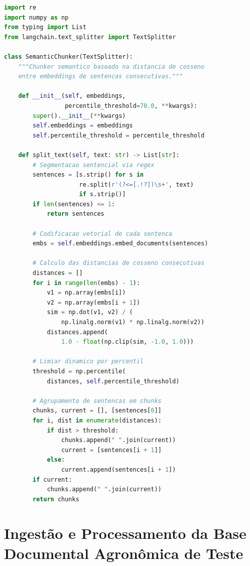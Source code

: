 \documentclass[
	12pt,				%
	openright,			%
	oneside,			%
	a4paper,			%
	tccpreliminar,		%
	]{ABNT-DC-UEL}
\begin{document}
\begin{lstlisting}[language=Python, caption={Implementação do \textit{Semantic Chunker} com \textit{breakpoints} baseados em distância de cosseno e limiar por percentil.}, label=lst:semantic]
import re
import numpy as np
from typing import List
from langchain.text_splitter import TextSplitter

class SemanticChunker(TextSplitter):
    """Chunker semantico baseado na distancia de cosseno 
    entre embeddings de sentencas consecutivas."""
    
    def __init__(self, embeddings, 
                 percentile_threshold=70.0, **kwargs):
        super().__init__(**kwargs)
        self.embeddings = embeddings
        self.percentile_threshold = percentile_threshold

    def split_text(self, text: str) -> List[str]:
        # Segmentacao sentencial via regex
        sentences = [s.strip() for s in 
                     re.split(r'(?<=[.!?])\s+', text) 
                     if s.strip()]
        if len(sentences) <= 1:
            return sentences

        # Codificacao vetorial de cada sentenca
        embs = self.embeddings.embed_documents(sentences)
        
        # Calculo das distancias de cosseno consecutivas
        distances = []
        for i in range(len(embs) - 1):
            v1 = np.array(embs[i])
            v2 = np.array(embs[i + 1])
            sim = np.dot(v1, v2) / (
                np.linalg.norm(v1) * np.linalg.norm(v2))
            distances.append(
                1.0 - float(np.clip(sim, -1.0, 1.0)))

        # Limiar dinamico por percentil
        threshold = np.percentile(
            distances, self.percentile_threshold)
        
        # Agrupamento de sentencas em chunks
        chunks, current = [], [sentences[0]]
        for i, dist in enumerate(distances):
            if dist > threshold:
                chunks.append(" ".join(current))
                current = [sentences[i + 1]]
            else:
                current.append(sentences[i + 1])
        if current:
            chunks.append(" ".join(current))
        return chunks
\end{lstlisting}

\section{Ingestão e Processamento da Base Documental Agronômica de Teste}
\end{document}
